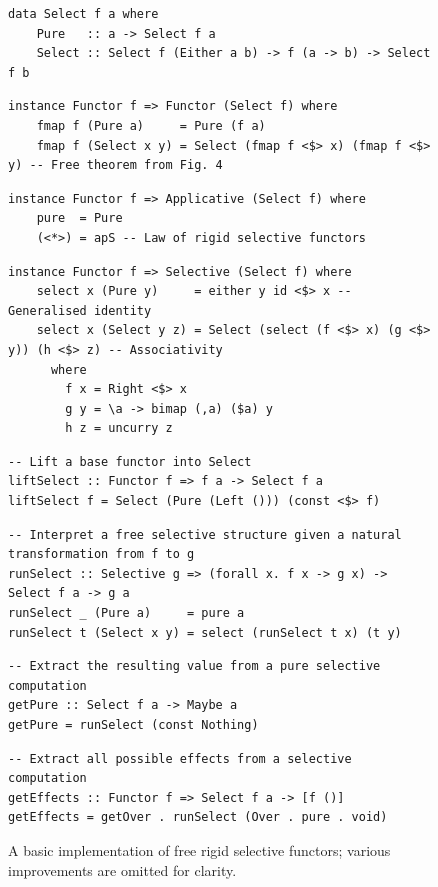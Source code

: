 \begin{figure}
\begin{verbatim}
data Select f a where
    Pure   :: a -> Select f a
    Select :: Select f (Either a b) -> f (a -> b) -> Select f b
\end{verbatim}
\vspace{0mm}
\begin{verbatim}
instance Functor f => Functor (Select f) where
    fmap f (Pure a)     = Pure (f a)
    fmap f (Select x y) = Select (fmap f <$> x) (fmap f <$> y) -- Free theorem from Fig. 4
\end{verbatim}
\vspace{0mm}
\begin{verbatim}
instance Functor f => Applicative (Select f) where
    pure  = Pure
    (<*>) = apS -- Law of rigid selective functors
\end{verbatim}
\vspace{0mm}
\begin{verbatim}
instance Functor f => Selective (Select f) where
    select x (Pure y)     = either y id <$> x -- Generalised identity
    select x (Select y z) = Select (select (f <$> x) (g <$> y)) (h <$> z) -- Associativity
      where
        f x = Right <$> x
        g y = \a -> bimap (,a) ($a) y
        h z = uncurry z
\end{verbatim}
\vspace{0mm}
\begin{verbatim}
-- Lift a base functor into Select
liftSelect :: Functor f => f a -> Select f a
liftSelect f = Select (Pure (Left ())) (const <$> f)
\end{verbatim}
\vspace{0mm}
\begin{verbatim}
-- Interpret a free selective structure given a natural transformation from f to g
runSelect :: Selective g => (forall x. f x -> g x) -> Select f a -> g a
runSelect _ (Pure a)     = pure a
runSelect t (Select x y) = select (runSelect t x) (t y)
\end{verbatim}
\vspace{0mm}
\begin{verbatim}
-- Extract the resulting value from a pure selective computation
getPure :: Select f a -> Maybe a
getPure = runSelect (const Nothing)
\end{verbatim}
\vspace{0mm}
\begin{verbatim}
-- Extract all possible effects from a selective computation
getEffects :: Functor f => Select f a -> [f ()]
getEffects = getOver . runSelect (Over . pure . void)
\end{verbatim}
\vspace{-3mm}
\caption{A basic implementation of free rigid selective functors; various
improvements are omitted for clarity.}\label{fig-free}
\vspace{-3mm}
\end{figure}

